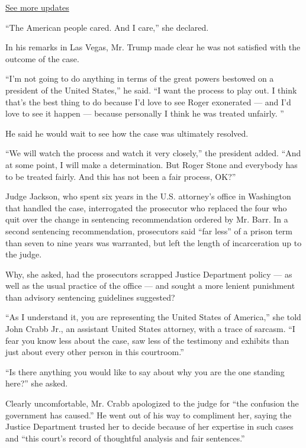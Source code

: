 \href{https://www.nytimes.com/2020/07/31/us/elections/biden-vs-trump.html?action=click\&pgtype=Article\&state=default\&region=MAIN_CONTENT_1\&context=storylines_live_updates}{See
more updates}

``The American people cared. And I care,'' she declared.

In his remarks in Las Vegas, Mr. Trump made clear he was not satisfied
with the outcome of the case.

``I'm not going to do anything in terms of the great powers bestowed on
a president of the United States,'' he said. ``I want the process to
play out. I think that's the best thing to do because I'd love to see
Roger exonerated --- and I'd love to see it happen --- because
personally I think he was treated unfairly. ''

He said he would wait to see how the case was ultimately resolved.

``We will watch the process and watch it very closely,'' the president
added. ``And at some point, I will make a determination. But Roger Stone
and everybody has to be treated fairly. And this has not been a fair
process, OK?''

Judge Jackson, who spent six years in the U.S. attorney's office in
Washington that handled the case, interrogated the prosecutor who
replaced the four who quit over the change in sentencing recommendation
ordered by Mr. Barr. In a second sentencing recommendation, prosecutors
said ``far less'' of a prison term than seven to nine years was
warranted, but left the length of incarceration up to the judge.

Why, she asked, had the prosecutors scrapped Justice Department policy
--- as well as the usual practice of the office --- and sought a more
lenient punishment than advisory sentencing guidelines suggested?

``As I understand it, you are representing the United States of
America,'' she told John Crabb Jr., an assistant United States attorney,
with a trace of sarcasm. ``I fear you know less about the case, saw less
of the testimony and exhibits than just about every other person in this
courtroom.''

``Is there anything you would like to say about why you are the one
standing here?'' she asked.

Clearly uncomfortable, Mr. Crabb apologized to the judge for ``the
confusion the government has caused.'' He went out of his way to
compliment her, saying the Justice Department trusted her to decide
because of her expertise in such cases and ``this court's record of
thoughtful analysis and fair sentences.''

